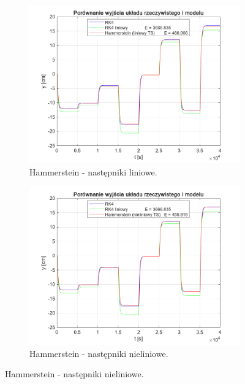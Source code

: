 \begin{figure}[b!]
\centering
\begin{subfigure}[b]{0.49\paperwidth}
\centering
\includegraphics[width=\linewidth]{pictures/HammersteinLinearModel_2}
\caption{Hammerstein - następniki liniowe.}
\end{subfigure}
\hfill
\begin{subfigure}[b]{0.49\paperwidth}
\centering
\includegraphics[width=\linewidth]{pictures/HammersteinNonlinearModel_2}
\caption{Hammerstein - następniki nieliniowe.}
\end{subfigure}
    
\vspace{0.5cm} %


\end{figure}
